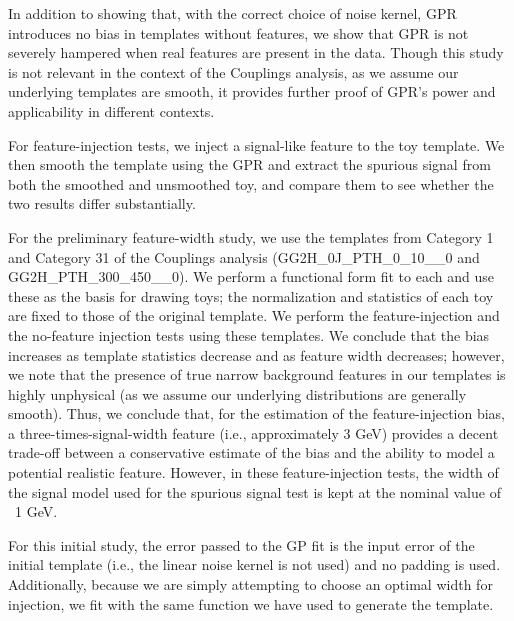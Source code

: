 In addition to showing that, with the correct choice of noise kernel, GPR introduces no bias in templates without features, we show that GPR is not severely hampered when real features are present in the data. Though this study is not relevant in the context of the Couplings analysis, as we assume our underlying templates are smooth, it provides further proof of GPR's power and applicability in different contexts.

For feature-injection tests, we inject a signal-like feature to the toy template. We then smooth the template using the GPR and extract the spurious signal from both the smoothed and unsmoothed toy, and compare them to see whether the two results differ substantially.

For the preliminary feature-width study, we use the templates from Category 1 and Category 31 of the Couplings analysis (GG2H\_0J\_PTH\_0\_10\_\_0 and GG2H\_PTH\_300\_450\_\_0). We perform a functional form fit to each and use these as the basis for drawing toys; the normalization and statistics of each toy are fixed to those of the original template. We perform the feature-injection and the no-feature injection tests using these templates. We conclude that the bias increases as template statistics decrease and as feature width decreases; however, we note that the presence of true narrow background features in our templates is highly unphysical (as we assume our underlying distributions are generally smooth). Thus, we conclude that, for the estimation of the feature-injection bias, a three-times-signal-width feature (i.e., approximately 3 GeV) provides a decent trade-off between a conservative estimate of the bias and the ability to model a potential realistic feature. However, in these feature-injection tests, the width of the signal model used for the spurious signal test is kept at the nominal value of ~1 GeV.

For this initial study, the error passed to the GP fit is the input error of the initial template (i.e., the linear noise kernel is not used) and no padding is used. Additionally, because we are simply attempting to choose an optimal width for injection, we fit with the same function we have used to generate the template. 

